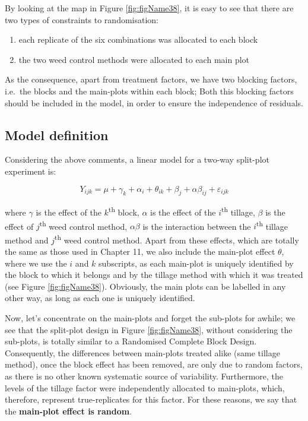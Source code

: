 \documentclass[a4paper,12pt,oneside]{book}
\providecommand{\tightlist}{%
  \setlength{\itemsep}{0pt}\setlength{\parskip}{0pt}}
\begin{document}
By looking at the map in Figure \ref{fig:figName38}, it is easy to see that there are two types of constraints to randomisation:

\begin{enumerate}
\def\labelenumi{\arabic{enumi}.}
\tightlist
\item
  each replicate of the six combinations was allocated to each block
\item
  the two weed control methods were allocated to each main plot
\end{enumerate}

As the consequence, apart from treatment factors, we have two blocking factors, i.e.~the blocks and the main-plots within each block; Both this blocking factors should be included in the model, in order to ensure the independence of residuals.

\hypertarget{model-definition-4}{%
\subsection{Model definition}\label{model-definition-4}}

Considering the above comments, a linear model for a two-way split-plot experiment is:

\[Y_{ijk} = \mu + \gamma_k + \alpha_i + \theta_{ik} + \beta_j + \alpha\beta_{ij} + \varepsilon_{ijk}\]

where \(\gamma\) is the effect of the \(k\)\textsuperscript{th} block, \(\alpha\) is the effect of the \(i\)\textsuperscript{th} tillage, \(\beta\) is the effect of \(j\)\textsuperscript{th} weed control method, \(\alpha\beta\) is the interaction between the \(i\)\textsuperscript{th} tillage method and \(j\)\textsuperscript{th} weed control method. Apart from these effects, which are totally the same as those used in Chapter 11, we also include the main-plot effect \(\theta\), where we use the \(i\) and \(k\) subscripts, as each main-plot is uniquely identified by the block to which it belongs and by the tillage method with which it was treated (see Figure \ref{fig:figName38}). Obviously, the main plots can be labelled in any other way, as long as each one is uniquely identified.

Now, let's concentrate on the main-plots and forget the sub-plots for awhile; we see that the split-plot design in Figure \ref{fig:figName38}, without considering the sub-plots, is totally similar to a Randomised Complete Block Design. Consequently, the differences between main-plots treated alike (same tillage method), once the block effect has been removed, are only due to random factors, as there is no other known systematic source of variability. Furthermore, the levels of the tillage factor were independently allocated to main-plots, which, therefore, represent true-replicates for this factor. For these reasons, we say that the \textbf{main-plot effect is random}.
\end{document}
